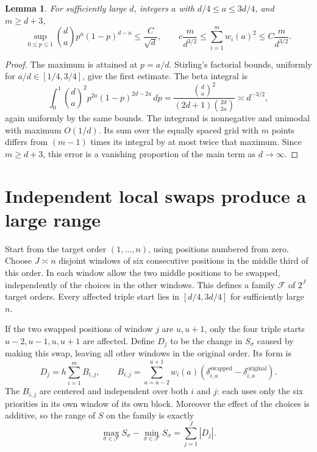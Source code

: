 \documentclass[11pt]{article}
\newtheorem{lemma}[theorem]{Lemma}
\begin{document}
\begin{lemma}\label{lem:binomial}
For sufficiently large $d$, integers $a$ with $d/4\leq a\leq3d/4$, and
$m\geq d+3$,
\[
 \sup_{0\leq p\leq1}\binom da p^a(1-p)^{d-a}\leq\frac C{\sqrt d},
 \qquad
 c\frac m{d^{3/2}}\leq\sum_{i=1}^m w_i(a)^2
                \leq C\frac m{d^{3/2}}.
\]
\end{lemma}
\begin{proof}
The maximum is attained at $p=a/d$. Stirling's factorial bounds, uniformly
for $a/d\in[1/4,3/4]$, give the first estimate. The beta integral is
\[
 \int_0^1\binom da^2p^{2a}(1-p)^{2d-2a}\,dp
 =\frac{\binom da^2}{(2d+1)\binom{2d}{2a}}
 \asymp d^{-3/2},
\]
again uniformly by the same bounds. The integrand is nonnegative and
unimodal with maximum $O(1/d)$. Its sum over the equally spaced grid with
$m$ points differs from $(m-1)$ times its integral by at most twice that
maximum. Since $m\geq d+3$, this error is a vanishing proportion of the
main term as $d\to\infty$.
\end{proof}

\section{Independent local swaps produce a large range}
Start from the target order $(1,\ldots,n)$, using positions numbered from
zero. Choose $J\asymp n$ disjoint windows of six consecutive positions in
the middle third of this order. In each window allow the two middle
positions to be swapped, independently of the choices in the other
windows. This defines a family $\mathcal F$ of $2^J$ target orders.
Every affected triple start lies in $[d/4,3d/4]$ for sufficiently large $n$.

If the two swapped positions of window $j$ are $u,u+1$, only the four
triple starts $u-2,u-1,u,u+1$ are affected. Define $D_j$ to be the change
in $S_\sigma$ caused by making this swap, leaving all other windows in
the original order. Its form is
\[
 D_j=h\sum_{i=1}^m B_{i,j},\qquad
 B_{i,j}=\sum_{a=u-2}^{u+1}w_i(a)
              (\delta_{i,a}^{\mathrm{swapped}}-\delta_{i,a}^{\mathrm{original}}).
\]
The $B_{i,j}$ are centered and independent over both $i$ and $j$: each
uses only the six priorities in its own window of its own block.
Moreover the effect of the choices is additive, so the range of $S$ on
the family is exactly
\begin{equation}\label{eq:range}
 \max_{\sigma\in\mathcal F}S_\sigma-
 \min_{\sigma\in\mathcal F}S_\sigma=\sum_{j=1}^J|D_j|.
\end{equation}
\end{document}
